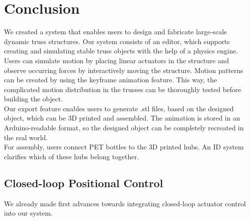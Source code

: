 \chapter{Conclusion}\label{ch:conclusion}
We created a system that enables users to design and fabricate large-scale dynamic truss structures. Our system consists of an editor, which supports creating and simulating stable truss objects with the help of a physics engine. Users can simulate motion by placing linear actuators in the structure and observe occurring forces by interactively moving the structure. Motion patterns can be created by using the keyframe animation feature. This way, the complicated motion distribution in the trusses can be thoroughly tested before building the object.\\
Our export feature enables users to generate .stl files, based on the designed object, which can be 3D printed and assembled. The animation is stored in an Arduino-readable format, so the designed object can be completely recreated in the real world.\\
For assembly, users connect PET bottles to the 3D printed hubs. An ID system clarifies which of these hubs belong together.

\section{Closed-loop Positional Control}
We already made first advances towards integrating closed-loop actuator control into our system.
